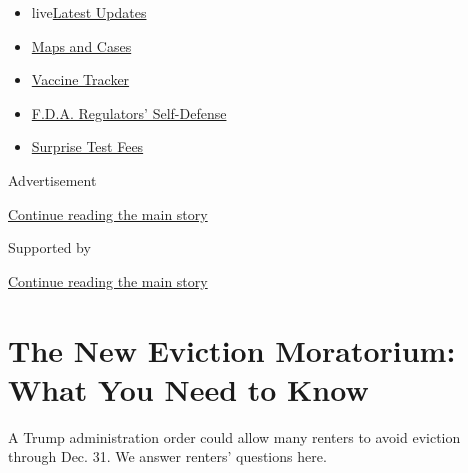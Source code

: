 \begin{itemize}
\tightlist
\item
  live\href{https://www.nytimes3xbfgragh.onion/2020/09/12/world/covid-19-coronavirus.html?name=styln-coronavirus-national\&region=TOP_BANNER\&block=storyline_menu_recirc\&action=click\&pgtype=Article\&impression_id=7c099e40-f52d-11ea-84d7-f589d7b1ff3e\&variant=undefined}{Latest
  Updates}
\item
  \href{https://www.nytimes3xbfgragh.onion/interactive/2020/us/coronavirus-us-cases.html?name=styln-coronavirus-national\&region=TOP_BANNER\&block=storyline_menu_recirc\&action=click\&pgtype=Article\&impression_id=7c099e41-f52d-11ea-84d7-f589d7b1ff3e\&variant=undefined}{Maps
  and Cases}
\item
  \href{https://www.nytimes3xbfgragh.onion/interactive/2020/science/coronavirus-vaccine-tracker.html?name=styln-coronavirus-national\&region=TOP_BANNER\&block=storyline_menu_recirc\&action=click\&pgtype=Article\&impression_id=7c099e42-f52d-11ea-84d7-f589d7b1ff3e\&variant=undefined}{Vaccine
  Tracker}
\item
  \href{https://www.nytimes3xbfgragh.onion/2020/09/10/us/politics/fda-coronavirus-vaccine.html?name=styln-coronavirus-national\&region=TOP_BANNER\&block=storyline_menu_recirc\&action=click\&pgtype=Article\&impression_id=7c099e43-f52d-11ea-84d7-f589d7b1ff3e\&variant=undefined}{F.D.A.
  Regulators' Self-Defense}
\item
  \href{https://www.nytimes3xbfgragh.onion/2020/09/09/upshot/coronavirus-surprise-test-fees.html?name=styln-coronavirus-national\&region=TOP_BANNER\&block=storyline_menu_recirc\&action=click\&pgtype=Article\&impression_id=7c099e44-f52d-11ea-84d7-f589d7b1ff3e\&variant=undefined}{Surprise
  Test Fees}
\end{itemize}

Advertisement

\protect\hyperlink{after-top}{Continue reading the main story}

Supported by

\protect\hyperlink{after-sponsor}{Continue reading the main story}

\hypertarget{the-new-eviction-moratorium-what-you-need-to-know}{%
\section{The New Eviction Moratorium: What You Need to
Know}\label{the-new-eviction-moratorium-what-you-need-to-know}}

A Trump administration order could allow many renters to avoid eviction
through Dec. 31. We answer renters' questions here.

